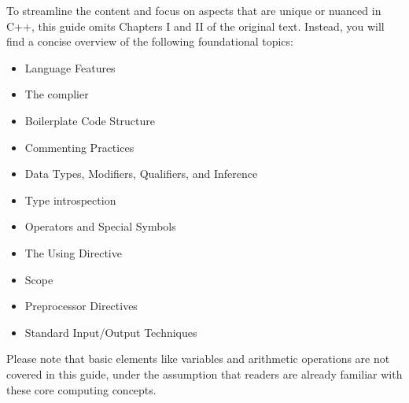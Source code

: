 \documentclass{report}
\begin{document}
    \bigbreak \noindent 
    To streamline the content and focus on aspects that are unique or nuanced in C++, this guide omits Chapters I and II of the original text. Instead, you will find a concise overview of the following foundational topics:
    \begin{itemize}
        \item Language Features
        \item The complier
        \item Boilerplate Code Structure
        \item Commenting Practices
        \item Data Types, Modifiers, Qualifiers, and Inference
        \item Type introspection
        \item Operators and Special Symbols
        \item The Using Directive
        \item Scope 
        \item Preprocessor Directives
        \item Standard Input/Output Techniques
    \end{itemize}
    \bigbreak \noindent
    Please note that basic elements like variables and arithmetic operations are not covered in this guide, under the assumption that readers are already familiar with these core computing concepts.

    
\end{document}
